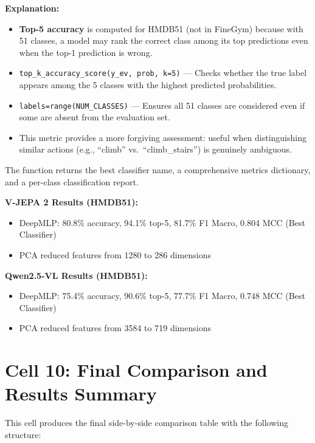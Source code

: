 \documentclass[a4paper, 12pt]{article}
\newenvironment{explanation}{%
  \par\smallskip
  \noindent\textcolor{blue!70!black}{\textbf{Explanation:}}\\
  \noindent
}{\par\medskip}
\begin{document}
\begin{explanation}
\begin{itemize}[nosep]
  \item \textbf{Top-5 accuracy} is computed for HMDB51 (not in FineGym) because with 51 classes, a model may rank the correct class among its top predictions even when the top-1 prediction is wrong.
  \item \texttt{top\_k\_accuracy\_score(y\_ev, prob, k=5)} --- Checks whether the true label appears among the 5 classes with the highest predicted probabilities.
  \item \texttt{labels=range(NUM\_CLASSES)} --- Ensures all 51 classes are considered even if some are absent from the evaluation set.
  \item This metric provides a more forgiving assessment: useful when distinguishing similar actions (e.g., ``climb'' vs.\ ``climb\_stairs'') is genuinely ambiguous.
\end{itemize}
\end{explanation}

The function returns the best classifier name, a comprehensive metrics dictionary, and a per-class classification report.

\textbf{V-JEPA 2 Results (HMDB51):}
\begin{itemize}[nosep]
  \item DeepMLP: 80.8\% accuracy, 94.1\% top-5, 81.7\% F1 Macro, 0.804 MCC (Best Classifier)
  \item PCA reduced features from 1280 to 286 dimensions
\end{itemize}

\textbf{Qwen2.5-VL Results (HMDB51):}
\begin{itemize}[nosep]
  \item DeepMLP: 75.4\% accuracy, 90.6\% top-5, 77.7\% F1 Macro, 0.748 MCC (Best Classifier)
  \item PCA reduced features from 3584 to 719 dimensions
\end{itemize}

\newpage
\section{Cell 10: Final Comparison and Results Summary}

This cell produces the final side-by-side comparison table with the following structure:
\end{document}
